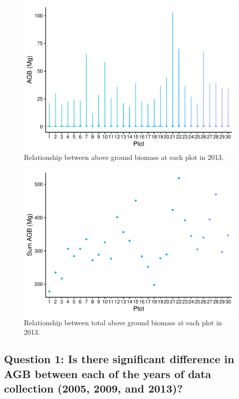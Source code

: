 \documentclass[12pt,]{article}
\begin{document}
\begin{figure}
\centering
\includegraphics{Project_Template_files/figure-latex/dataviz_2013-1.pdf}
\caption{Relationship between above ground biomass at each plot in
2013.}
\end{figure}

\begin{figure}
\centering
\includegraphics{Project_Template_files/figure-latex/dataviz_sum_2013-1.pdf}
\caption{Relationship between total above ground biomass at each plot in
2013.}
\end{figure}

\hypertarget{question-1-is-there-significant-difference-in-agb-between-each-of-the-years-of-data-collection-2005-2009-and-2013}{%
\subsection{Question 1: Is there significant difference in AGB between
each of the years of data collection (2005, 2009, and
2013)?}\label{question-1-is-there-significant-difference-in-agb-between-each-of-the-years-of-data-collection-2005-2009-and-2013}}
\end{document}
